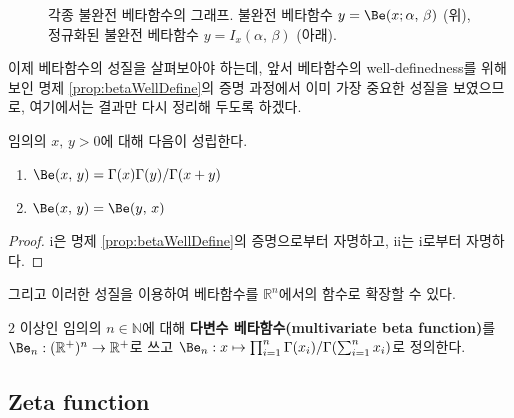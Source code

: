 \begin{figure}[!ht]
    \caption{각종 불완전 베타함수의 그래프. 불완전 베타함수 $y=\Be(x;\alpha,\,\beta)$ (위), 정규화된 불완전 베타함수 $y=I_x(\alpha,\,\beta)$ (아래).}
\end{figure}

이제 베타함수의 성질을 살펴보아야 하는데, 앞서 베타함수의 well-definedness를 위해 보인 명제 \ref{prop:betaWellDefine}의 증명 과정에서 이미 가장 중요한 성질을 보였으므로, 여기에서는 결과만 다시 정리해 두도록 하겠다.

\begin{corollary}
    임의의 $x,\,y>0$에 대해 다음이 성립한다.
    \begin{enumerate}
        \item $\Be(x,\,y)=\Gamma(x)\Gamma(y)/\Gamma(x+y)$
        \item $\Be(x,\,y)=\Be(y,\,x)$
    \end{enumerate}
\end{corollary}

\begin{proof}
    i은 명제 \ref{prop:betaWellDefine}의 증명으로부터 자명하고, ii는 i로부터 자명하다.
\end{proof}

그리고 이러한 성질을 이용하여 베타함수를 $\mathbb{R}^n$에서의 함수로 확장할 수 있다.

\begin{definition}
    $2$ 이상인 임의의 $n\in\mathbb{N}$에 대해 \textbf{다변수 베타함수(multivariate beta function)}를 $\Be_n:(\mathbb{R}^+)^n\to\mathbb{R}^+$로 쓰고 $\Be_n:x\mapsto\prod_{i=1}^n\Gamma(x_i)/\Gamma(\sum_{i=1}^nx_i)$로 정의한다.
\end{definition}

\subsection{Zeta function}

